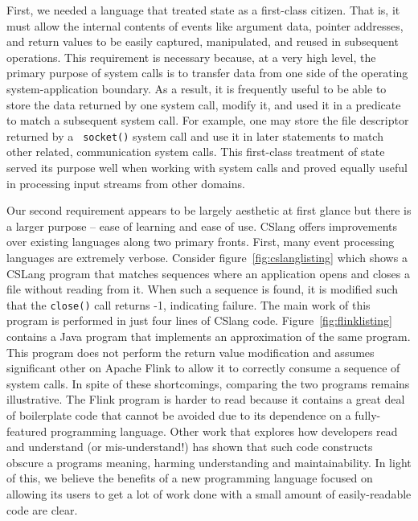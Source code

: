 First, we needed a language that treated state as a first-class citizen.
That is, it must allow the internal contents of events like argument data,
pointer addresses, and return values to be easily captured, manipulated, and
reused in subsequent operations.
This requirement is necessary because,
at a very high level,
the primary purpose of system calls is to transfer data
from one side of the operating system-application boundary.
As a result, it is frequently useful to be able to store the data returned by
one system call, modify it, and used it in a predicate to match a subsequent
system call.  For example, one may store the file descriptor returned by a {\tt
socket()} system call and use it in later statements to match other related,
communication system calls.  This first-class treatment of state served its
purpose well when working with system calls and proved equally useful in
processing input streams from other domains.





Our second requirement appears to be largely aesthetic at first glance
but there is a
larger purpose -- ease of learning and ease of use.  CSlang offers
improvements over existing languages along two primary fronts.
First, many event processing languages are extremely verbose.
Consider figure~\ref{fig:cslanglisting}  which shows a
CSLang program that matches sequences where an application opens and closes
a file without reading from it.  When such a sequence is found, it is
modified such that the {\tt close()} call returns -1, indicating failure.
The main work of this program is performed in just four lines of CSlang
code.  Figure~\ref{fig:flinklisting} contains a Java program that
implements an approximation of the same program.  This program does not
perform the return value modification and assumes significant other on
Apache Flink to allow it to correctly consume a sequence of system calls.
In spite of these shortcomings, comparing the two programs remains
illustrative.  The Flink program is harder to read because it contains a
great deal of boilerplate code
that cannot be avoided due to its dependence on a fully-featured
programming language.  Other work that explores how developers read and
understand (or mis-understand!) has shown that such code constructs obscure
a programs meaning, harming understanding and maintainability.
In light of this, we believe the benefits of a
new programming language
focused on allowing its users to get a lot of work done
with a small amount of easily-readable code are clear.

